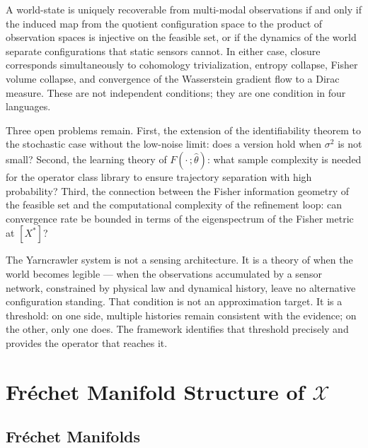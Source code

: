 \documentclass[12pt, oneside]{article}
\begin{document}
A world-state is uniquely recoverable from multi-modal observations if and only if the
induced map from the quotient configuration space to the product of observation spaces is
injective on the feasible set, or if the dynamics of the world separate configurations
that static sensors cannot. In either case, closure corresponds simultaneously to
cohomology trivialization, entropy collapse, Fisher volume collapse, and convergence of the
Wasserstein gradient flow to a Dirac measure. These are not independent conditions; they
are one condition in four languages.

Three open problems remain. First, the extension of the identifiability theorem to the
stochastic case without the low-noise limit: does a version hold when $\sigma^2$ is not
small? Second, the learning theory of $F(\cdot\,;\hat{\theta})$: what sample complexity
is needed for the operator class library to ensure trajectory separation with high
probability? Third, the connection between the Fisher information geometry of the feasible
set and the computational complexity of the refinement loop: can convergence rate be
bounded in terms of the eigenspectrum of the Fisher metric at $[X^*]$?

The Yarncrawler system is not a sensing architecture. It is a theory of when the world
becomes legible --- when the observations accumulated by a sensor network, constrained by
physical law and dynamical history, leave no alternative configuration standing. That
condition is not an approximation target. It is a threshold: on one side, multiple
histories remain consistent with the evidence; on the other, only one does. The framework
identifies that threshold precisely and provides the operator that reaches it.


\appendix

\section{Fréchet Manifold Structure of $\mathcal{X}$}
\label{app:frechet}

\subsection{Fréchet Manifolds}
\end{document}

